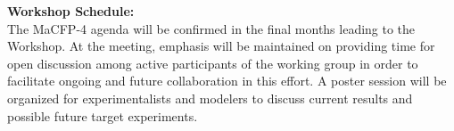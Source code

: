 \documentclass[12pt]{article}
\begin{document}
\textbf{Workshop Schedule:}\\
The MaCFP-4 agenda will be confirmed in the final months leading to the Workshop. At the meeting, emphasis will be maintained on providing time for open discussion among active participants of the working group in order to facilitate ongoing and future collaboration in this effort. A poster session will be organized for experimentalists and modelers to discuss current results and possible future target experiments. \\



\clearpage
\end{document}
